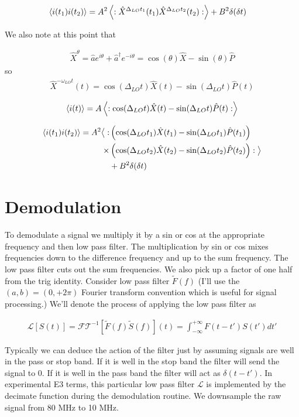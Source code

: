 \documentclass[12pt]{article}
\begin{document}
\begin{align}
\braket{i(t_1)i(t_2)} & = A^2 \left<:\hat{X}^{\Delta_{LO}t_1}(t_1)\hat{X}^{\Delta_{LO}t_2}(t_2):\right> +B^2\delta(\delta t)
\end{align}

We also note at this point that

\begin{align}
\hat{X}^{\theta} = \hat{a}e^{i\theta} + \hat{a}^{\dag}e^{-i\theta} = \cos(\theta) \hat{X} - \sin(\theta)\hat{P}
\end{align}
so
\begin{align}
\hat{X}^{-\omega_{LO} t}(t) = \cos(\Delta_{LO} t)\hat{X}(t) - \sin(\Delta_{LO} t)\hat{P}(t)
\end{align}

\begin{align}
\braket{i(t)} = A \left<: \cos(\Delta_{LO} t)\hat{X}(t) - \sin(\Delta_{LO} t)\hat{P}(t):\right>
\end{align}

\begin{align}
\braket{i(t_1)i(t_2)} = A^2 \big<:&\left(\cos(\Delta_{LO} t_1)\hat{X}(t_1) - \sin(\Delta_{LO} t_1)\hat{P}(t_1)\right)\\
\times &\left(\cos(\Delta_{LO} t_2)\hat{X}(t_2) - \sin(\Delta_{LO} t_2)\hat{P}(t_2)\right):\big>\\ 
&+B^2\delta(\delta t)
\end{align}

\section{Demodulation}

To demodulate a signal we multiply it by a sin or cos at the appropriate frequency and then low pass filter. The multiplication by sin or cos mixes frequencies down to the difference frequency and up to the sum frequency. The low pass filter cuts out the sum frequencies. We also pick up a factor of one half from the trig identity. Consider low pass filter $\tilde{F}(f)$ (I'll use the $(a,b) = (0,+2\pi)$ Fourier transform convention which is useful for signal processing.) We'll denote the process of applying the low pass filter as

\begin{align}
\mathcal{L}[S(t)] = \mathcal{FT}^{-1}\left[\tilde{F}(f)\tilde{S}(f)\right](t) = \int_{-\infty}^{+\infty} F(t-t')S(t') dt'
\end{align}

Typically we can deduce the action of the filter just by assuming signals are well in the pass or stop band. If it is well in the stop band the filter will send the signal to 0. If it is well in the pass band the filter will act as $\delta(t-t')$.
In experimental E3 terms, this particular low pass filter $\mathcal{L}$ is implemented by the decimate function during the demodulation routine. We downsample the raw signal from 80 MHz to 10 MHz.
\end{document}
